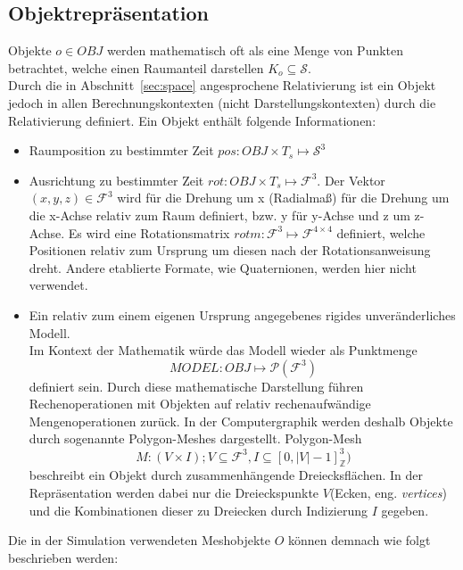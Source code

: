 \subsection{Objektrepräsentation}
\label{sec:objects_rep}
Objekte $o\in OBJ$ werden mathematisch oft als eine Menge von Punkten betrachtet, welche einen Raumanteil darstellen $ K_o \subseteq \mathcal{S}$.\\
Durch die in Abschnitt~\ref{sec:space} angesprochene Relativierung ist ein Objekt jedoch in allen Berechnungskontexten (nicht Darstellungskontexten) durch die Relativierung definiert. Ein Objekt enthält folgende Informationen:
\begin{itemize}
\item Raumposition zu bestimmter Zeit $pos : OBJ \times T_s \mapsto \mathcal{S}^3$
\item Ausrichtung zu bestimmter Zeit $rot : OBJ \times T_s \mapsto \mathcal{F}^3$. Der Vektor $(x, y, z) \in\mathcal{F}^3$ wird für die Drehung um x (Radialmaß) für die Drehung um die x-Achse relativ zum Raum definiert, bzw. y für y-Achse und z um z-Achse. Es wird eine Rotationsmatrix $rotm: \mathcal{F}^3 \mapsto \mathcal{F}^{4\times 4}$ definiert, welche Positionen relativ zum Ursprung um diesen nach der Rotationsanweisung dreht. Andere etablierte Formate, wie Quaternionen, werden hier nicht verwendet.
\item Ein relativ zum einem eigenen Ursprung angegebenes rigides unveränderliches Modell.\\
\sloppy
Im Kontext der Mathematik würde das Modell wieder als Punktmenge $$ MODEL : OBJ \mapsto \mathcal{P}(\mathcal{F}^3) $$ definiert sein.
\fussy
Durch diese mathematische Darstellung führen Rechenoperationen mit Objekten auf relativ rechenaufwändige Mengenoperationen zurück. In der Computergraphik werden deshalb Objekte durch sogenannte Polygon-Meshes dargestellt. 
Polygon-Mesh $$M: (V \times I); V \subseteq \mathcal{F}^3, I \subseteq [0, |V|-1]_\mathbb{Z}^3 )$$ beschreibt ein Objekt durch zusammenhängende Dreiecksflächen. In der Repräsentation werden dabei nur die Dreieckspunkte $V$(Ecken, eng. \textit{vertices}) und die Kombinationen dieser zu Dreiecken durch Indizierung $I$ gegeben.\\

\end{itemize}  
Die in der Simulation verwendeten Meshobjekte $O$ können demnach wie folgt beschrieben werden:
